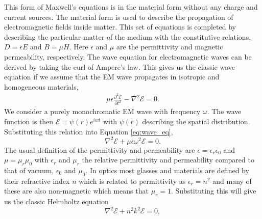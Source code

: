 \documentclass[letterpaper]{ar-1col}
\begin{document}
This form of Maxwell's equations is in the material form without any charge and current sources.
%
The material form is used to describe the propagation of electromagnetic fields inside matter.
%
This set of equations is completed by describing the particular matter of the medium with the constitutive relations, $D=\epsilon E$ and $B=\mu H$. 
%
Here $\epsilon$ and $\mu$ are the permittivity and magnetic permeability, respectively.
%
The wave equation for electromagnetic waves can be derived by taking the curl of Ampere's law.
%
This gives us the classic wave equation if we assume that the EM wave propagates in isotropic and homogeneous materials,
\begin{equation}
\label{eq:wave_eq}
\begin{aligned}
\mu \epsilon \frac{\partial^2 \mathcal{E}}{\partial t^2} - \nabla^2\mathcal{E} = 0 .
\end{aligned}
\end{equation}
We consider a purely monochromatic EM wave with frequency $\omega$.
%
The wave function is then $\mathcal{E}=\psi(r) e^{iwt}$ with $\psi(r)$ describing the spatial distribution.
%
Substituting this relation into Equation \ref{eq:wave_eq},
\begin{equation}
\nabla^2\mathcal{E} +\mu \epsilon \omega^2 \mathcal{E} = 0.
\end{equation}
The usual definition of the permittivity and permeability are $\epsilon=\epsilon_r \epsilon_0$ and $\mu=\mu_r \mu_0$ with $\epsilon_r$ and $\mu_r$ the relative permittivity and permeability compared to that of vacuum, $\epsilon_0$ and $\mu_0$.
%
In optics most glasses and materials are defined by their refractive index $n$ which is related to permittivity as $\epsilon_r = n^2$ and many of these are also non-magnetic which means that $\mu_r=1$.
%
Substituting this will give us the classic Helmholtz equation
\begin{equation}
\nabla^2\mathcal{E} + n^2k^2 \mathcal{E} = 0,
\end{equation}
\end{document}
